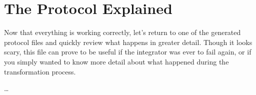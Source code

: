\newpage
\section{The Protocol Explained}
\genHeader


Now that everything is working correctly, let's return to one of the generated protocol files and quickly review what happens in greater detail. Though it looks
scary, this file can prove to be useful if the integrator was ever to fail again, or if you simply wanted to know more detail about what happened during the
transformation process.

\ldots
